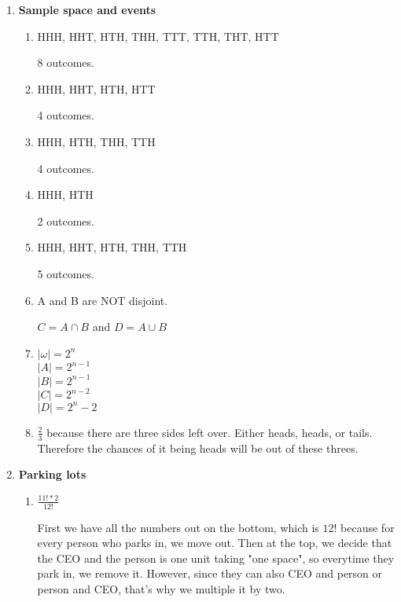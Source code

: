 \documentclass[12pt,fleqn]{article}
\begin{document}
\begin{enumerate}
  
  \newpage
  \item \textbf{Sample space and events}
  
  \begin{enumerate}
    \item 
    HHH, HHT, HTH, THH, TTT, TTH, THT, HTT
    
    8 outcomes. 
    
    \item 
    HHH, HHT, HTH, HTT
    
    4 outcomes.
    
    \item 
    HHH, HTH, THH, TTH
    
    4 outcomes.
    
    \item 
    HHH, HTH
    
    2 outcomes.
    
    \item 
    HHH, HHT, HTH, THH, TTH
    
    5 outcomes.
    
    \item 
    A and B are NOT disjoint. 
    
    $C = A \cap B$ and $D = A \cup B$
    
    \item 
    $|\omega| = 2^n$ \\
    $|A| = 2^{n-1}$ \\
    $|B| = 2^{n-1}$ \\
    $|C| = 2^{n-2}$ \\
    $|D| = 2^{n} - 2$
    
    \item 
    $\frac{2}{3}$ because there are three sides left over. Either heads, heads, or tails. Therefore the chances of it being heads will be out of these threes. 
      
  \end{enumerate}
  
  
  \newpage
  \item \textbf{Parking lots}
  
  \begin{enumerate}
    \item 
    $\frac{11! * 2}{12!}$
    
    First we have all the numbers out on the bottom, which is $12!$ because for every person who parks in, we move out. Then at the top, we decide that the CEO and the person is one unit taking "one space", so everytime they park in, we remove it. However, since they can also CEO and person or person and CEO, that's why we multiple it by two. 
    

\end{enumerate}
\end{enumerate}
\end{document}
